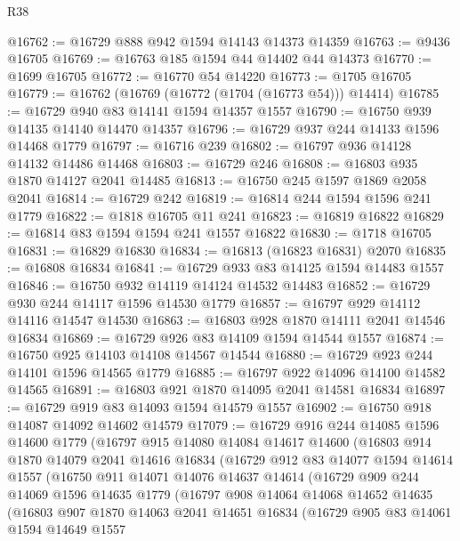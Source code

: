 \begin{lexlean}{R38}
\begin{coremodule}
@16762 := @16729 @888 @942 @1594 @14143 @14373 @14359
@16763 := @9436 @16705
@16769 := @16763 @185 @1594 @44 @14402 @44 @14373
@16770 := @1699 @16705
@16772 := @16770 @54 @14220
@16773 := @1705 @16705
@16779 := @16762 (@16769 (@16772 (@1704 (@16773 @54))) @14414)
@16785 := @16729 @940 @83 @14141 @1594 @14357 @1557
@16790 := @16750 @939 @14135 @14140 @14470 @14357
@16796 := @16729 @937 @244 @14133 @1596 @14468 @1779
@16797 := @16716 @239
@16802 := @16797 @936 @14128 @14132 @14486 @14468
@16803 := @16729 @246
@16808 := @16803 @935 @1870 @14127 @2041 @14485
@16813 := @16750 @245 @1597 @1869 @2058 @2041
@16814 := @16729 @242
@16819 := @16814 @244 @1594 @1596 @241 @1779
@16822 := @1818 @16705 @11 @241
@16823 := @16819 @16822
@16829 := @16814 @83 @1594 @1594 @241 @1557 @16822
@16830 := @1718 @16705
@16831 := @16829 @16830
@16834 := @16813 (@16823 @16831) @2070
@16835 := @16808 @16834
@16841 := @16729 @933 @83 @14125 @1594 @14483 @1557
@16846 := @16750 @932 @14119 @14124 @14532 @14483
@16852 := @16729 @930 @244 @14117 @1596 @14530 @1779
@16857 := @16797 @929 @14112 @14116 @14547 @14530
@16863 := @16803 @928 @1870 @14111 @2041 @14546 @16834
@16869 := @16729 @926 @83 @14109 @1594 @14544 @1557
@16874 := @16750 @925 @14103 @14108 @14567 @14544
@16880 := @16729 @923 @244 @14101 @1596 @14565 @1779
@16885 := @16797 @922 @14096 @14100 @14582 @14565
@16891 := @16803 @921 @1870 @14095 @2041 @14581 @16834
@16897 := @16729 @919 @83 @14093 @1594 @14579 @1557
@16902 := @16750 @918 @14087 @14092 @14602 @14579
@17079 := @16729
    @916
    @244
    @14085
    @1596
    @14600
    @1779
    (@16797
      @915
      @14080
      @14084
      @14617
      @14600
      (@16803
        @914
        @1870
        @14079
        @2041
        @14616
        @16834
        (@16729
          @912
          @83
          @14077
          @1594
          @14614
          @1557
          (@16750
            @911
            @14071
            @14076
            @14637
            @14614
            (@16729
              @909
              @244
              @14069
              @1596
              @14635
              @1779
              (@16797
                @908
                @14064
                @14068
                @14652
                @14635
                (@16803
                  @907
                  @1870
                  @14063
                  @2041
                  @14651
                  @16834
                  (@16729
                    @905
                    @83
                    @14061
                    @1594
                    @14649
                    @1557

\end{coremodule}
\end{lexlean}
